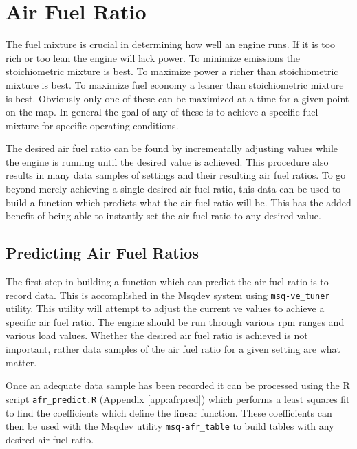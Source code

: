 \documentclass{article}
\begin{document}
\section{Air Fuel Ratio}
\label{sec:afr}

The fuel mixture is crucial in determining how well an engine runs.
If it is too rich or too lean the engine will lack power.
To minimize emissions the stoichiometric mixture is best.
To maximize power a richer than stoichiometric mixture is best.
To maximize fuel economy a leaner than stoichiometric mixture is best.
Obviously only one of these can be maximized at a time for a given
point on the map.
In general the goal of any of these is to achieve a specific fuel
mixture for specific operating conditions.

The desired air fuel ratio can be found by incrementally adjusting
values while the engine is running until the desired value is achieved.
This procedure also results in many data samples of settings and their
resulting air fuel ratios.
To go beyond merely achieving a single desired air fuel ratio, this data
can be used to build a function which predicts what the air
fuel ratio will be.
This has the added benefit of being able to instantly set the air fuel ratio
to any desired value.

\subsection{Predicting Air Fuel Ratios}
\label{sec:predafr}

The first step in building a function which can predict the air fuel ratio
is to record data.
This is accomplished in the Msqdev system using \verb+msq-ve_tuner+ utility.
This utility will attempt to adjust the current ve values to achieve
a specific air fuel ratio.
The engine should be run through various rpm ranges and various load values.
Whether the desired air fuel ratio is achieved is not important,
rather data samples of the air fuel ratio for a given setting are what
matter.

Once an adequate data sample has been recorded it can be processed 
using the R script \verb+afr_predict.R+ (Appendix \ref{app:afrpred})
which performs a least squares fit to find the coefficients which define
the linear function.
These coefficients can then be used with the Msqdev utility \verb+msq-afr_table+
to build tables with any desired air fuel ratio.
\end{document}
